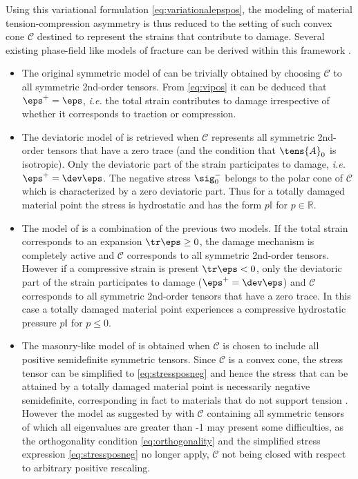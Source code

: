 Using this variational formulation \eqref{eq:variationalepspos}, the modeling of material tension-compression asymmetry is thus reduced to the setting of such convex cone $\mathcal{C}$ destined to represent the strains that contribute to damage. Several existing phase-field like models of fracture can be derived within this framework \cite{FreddiRoyer-Carfagni:2010}.
\begin{itemize}
\item The original symmetric model of \cite{BourdinFrancfortMarigo:2000} can be trivially obtained by choosing $\mathcal{C}$ to all symmetric 2nd-order tensors. From \eqref{eq:vipos} it can be deduced that $\eps^+=\eps$, \emph{i.e.} the total strain contributes to damage irrespective of whether it corresponds to traction or compression.

\item The deviatoric model of \cite{LancioniRoyer-Carfagni:2009} is retrieved when $\mathcal{C}$ represents all symmetric 2nd-order tensors that have a zero trace (and the condition that $\tens{A}_0$ is isotropic). Only the deviatoric part of the strain participates to damage, \emph{i.e.} $\eps^+=\dev\eps$. The negative stress $\sig_0^-$ belongs to the polar cone of $\mathcal{C}$ which is characterized by a zero deviatoric part. Thus for a totally damaged material point the stress is hydrostatic and has the form $p\mathbb{I}$ for $p\in\mathbb{R}$.

\item The model of \cite{AmorMarigoMaurini:2009} is a combination of the previous two models. If the total strain corresponds to an expansion $\tr\eps\geq 0$, the damage mechanism is completely active and $\mathcal{C}$ corresponds to all symmetric 2nd-order tensors. However if a compressive strain is present $\tr\eps< 0$, only the deviatoric part of the strain participates to damage ($\eps^+=\dev\eps$) and $\mathcal{C}$ corresponds to all symmetric 2nd-order tensors that have a zero trace. In this case a totally damaged material point experiences a compressive hydrostatic pressure $p\mathbb{I}$ for $p\leq 0$.

\item The masonry-like model of \cite{FreddiRoyer-Carfagni:2010} is obtained when $\mathcal{C}$ is chosen to include all positive semidefinite symmetric tensors. Since $\mathcal{C}$ is a convex cone, the stress tensor can be simplified to \eqref{eq:stressposneg} and hence the stress that can be attained by a totally damaged material point is necessarily negative semidefinite, corresponding in fact to materials that do not support tension \cite{PieroLancioniMarch:2007}. However the model as suggested by \cite{FreddiRoyer-Carfagni:2010} with $\mathcal{C}$ containing all symmetric tensors of which all eigenvalues are greater than -1 may present some difficulties, as the orthogonality condition \eqref{eq:orthogonality} and the simplified stress expression \eqref{eq:stressposneg} no longer apply, $\mathcal{C}$ not being closed with respect to arbitrary positive rescaling.
\end{itemize}

